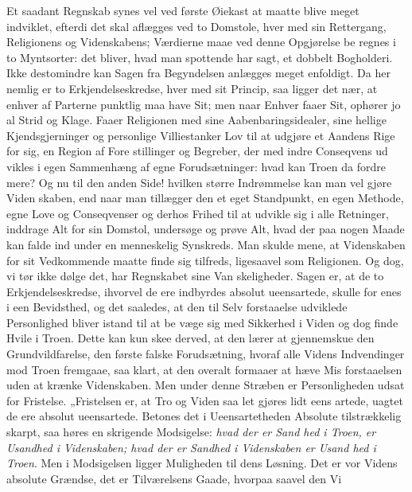\documentclass[12pt]{book}
\newcommand{\opage}[1]{\marginnote{\footnotesize\textit{[#1]}}}
\begin{document}
Et saadant Regnskab synes vel ved første Øiekast
at maatte blive meget indviklet, efterdi det skal aflægges
ved to Domstole, hver med sin Rettergang, Religionens og
Videnskabens; Værdierne maae ved denne Opgjørelse be\-%
regnes i to Myntsorter: det bliver, hvad man spottende har
sagt, et dobbelt Bogholderi. Ikke destomindre kan Sagen
fra Begyndelsen anlægges meget enfoldigt. Da her nemlig er
to Erkjendelseskredse, hver med sit Princip, saa ligger det
nær, at enhver af Parterne punktlig maa have Sit; men naar
\opage{226}\setcounter{footnote}{0}%
Enhver faaer Sit, ophører jo al Strid og Klage. Faaer
Religionen med sine Aabenbaringsidealer, sine hellige
Kjendsgjerninger og personlige Villiestanker Lov til at
udgjøre et Aandens Rige for sig, en Region af Fore\-%
stillinger og Begreber, der med indre Conseqvens ud\-%
vikles i egen Sammenhæng af egne Forudsætninger: hvad
kan Troen da fordre mere? Og nu til den anden Side!
hvilken større Indrømmelse kan man vel gjøre Viden\-%
skaben, end naar man tillægger den et eget Standpunkt,
en egen Methode, egne Love og Conseqvenser og derhos
Frihed til at udvikle sig i alle Retninger, inddrage Alt
for sin Domstol, undersøge og prøve Alt, hvad der paa
nogen Maade kan falde ind under en menneskelig Synskreds.
Man skulde mene, at Videnskaben for sit Vedkommende
maatte finde sig tilfreds, ligesaavel som Religionen. Og
dog, vi tør ikke dølge det, har Regnskabet sine Van\-%
skeligheder. Sagen er, at de to Erkjendelseskredse,
ihvorvel de ere indbyrdes absolut ueensartede, skulle for\-%
enes i een Bevidsthed, og det saaledes, at den til Selv\-%
forstaaelse udviklede Personlighed bliver istand til at be\-%
væge sig med Sikkerhed i Viden og dog finde Hvile i
Troen. Dette kan kun skee derved, at den lærer at
gjennemskue den Grundvildfarelse, den første falske
Forudsætning, hvoraf alle Videns Indvendinger mod Troen
fremgaae, saa klart, at den overalt formaaer at hæve Mis\-%
forstaaelsen uden at krænke Videnskaben. Men under
denne Stræben er Personligheden udsat for Fristelse.
„Fristelsen er, at Tro og Viden saa let gjøres lidt eens\-%
artede, uagtet de ere absolut ueensartede. Betones det
i Ueensartetheden Absolute tilstrækkelig skarpt, saa
høres en skrigende Modsigelse: \emph{hvad der er Sand\-%
hed i Troen, er Usandhed i Videnskaben;
hvad der er Sandhed i Videnskaben er Usand\-%
hed i Troen}. Men i Modsigelsen ligger Muligheden
\opage{227}\setcounter{footnote}{0}%
til dens Løsning. Det er vor Videns absolute Grændse,
det er Tilværelsens Gaade, hvorpaa saavel den Vi\-%
\end{document}
